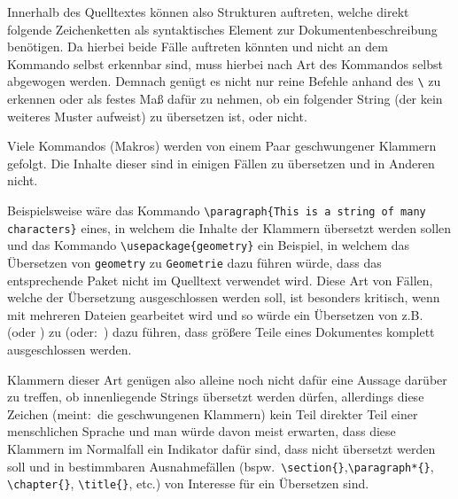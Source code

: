 Innerhalb des Quelltextes können also Strukturen auftreten, welche direkt folgende Zeichenketten als syntaktisches Element zur Dokumentenbeschreibung benötigen. Da hierbei beide Fälle auftreten könnten und nicht an dem Kommando selbst erkennbar sind, muss hierbei nach Art des Kommandos selbst abgewogen werden. Demnach genügt es nicht nur reine Befehle anhand des \verb|\| zu erkennen oder als festes Maß dafür zu nehmen, ob ein folgender String (der kein weiteres Muster aufweist) zu übersetzen ist, oder nicht.

Viele Kommandos (Makros) werden von einem Paar geschwungener Klammern gefolgt. Die Inhalte dieser sind in einigen Fällen zu übersetzen und in Anderen nicht. 

Beispielsweise wäre das Kommando \verb|\paragraph{This is a string of many characters}| eines, in welchem die Inhalte der Klammern übersetzt werden sollen und das Kommando \verb|\usepackage{geometry}| ein Beispiel, in welchem das Übersetzen von \verb|geometry| zu \verb|Geometrie| dazu führen würde, dass das entsprechende Paket nicht im Quelltext verwendet wird. Diese Art von Fällen, welche der Übersetzung ausgeschlossen werden soll, ist besonders kritisch, wenn mit mehreren Dateien gearbeitet wird und so würde ein Übersetzen von z.B.\ \verb|| (oder \verb||) zu \verb|| (oder:\ \verb||) dazu führen, dass größere Teile eines Dokumentes komplett ausgeschlossen werden. 

Klammern dieser Art genügen also alleine noch nicht dafür eine Aussage darüber zu treffen, ob innenliegende Strings übersetzt werden dürfen, allerdings diese Zeichen (meint:\ die geschwungenen Klammern) kein Teil direkter Teil einer menschlichen Sprache und man würde davon meist erwarten, dass diese Klammern im Normalfall ein Indikator dafür sind, dass nicht übersetzt werden soll und in bestimmbaren Ausnahmefällen (bspw.\ \verb|\section{}|,\verb|\paragraph*{}|, \verb|\chapter{}|, \verb|\title{}|, etc.) von Interesse für ein Übersetzen sind. 

